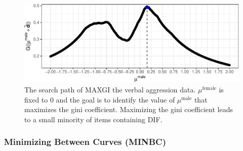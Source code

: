 \documentclass[
  english,
  man,floatsintext]{apa6}
\begin{document}
\begin{figure}[h]

{\centering \includegraphics{paper_apa_files/figure-latex/thegini-1}

}

\caption{The search path of MAXGI the verbal aggression data. $\mu^\text{female}$ is fixed to 0 and the goal is to identify the value of $\mu^\text{male}$ that maximizes the gini coefficient. Maximizing the gini coefficient leads to a small minority of items containing DIF.}\label{fig:thegini}
\end{figure}

\hypertarget{minimizing-between-curves-minbc}{%
\subsubsection{Minimizing Between Curves (MINBC)}\label{minimizing-between-curves-minbc}}
\end{document}
